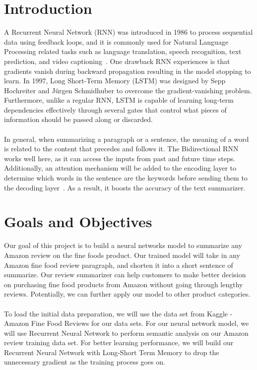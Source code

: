 \documentclass[conference]{IEEEtran}
\begin{document}
\section{Introduction}
A Recurrent Neural Network (RNN) was introduced in 1986 to process sequential data using feedback loops, and it is commonly used for Natural Language Processing related tasks such as language translation, speech recognition, text prediction, and video captioning~\cite{staudemeyer2019understanding}. One drawback RNN experiences is that gradients vanish during backward propagation resulting in the model stopping to learn. In 1997, Long Short-Term Memory (LSTM) was designed by Sepp Hochreiter and J\"{u}rgen Schmidhuber to overcome the gradient-vanishing problem. Furthermore, unlike a regular RNN, LSTM is capable of learning long-term dependencies effectively through several gates that control what pieces of information should be passed along or discarded. \\ \\
\indent In general, when summarizing a paragraph or a sentence, the meaning of a word is related to the content that precedes and follows it. The Bidirectional RNN works well here, as it can access the inputs from past and future time steps. Additionally, an attention mechanism will be added to the encoding layer to determine which words in the sentence are the keywords before sending them to the decoding layer~\cite{vaswani2017attention}. As a result, it boosts the accuracy of the text summarizer.

\section{Goals and Objectives}
Our goal of this project is to build a neural networks model to summarize any Amazon review on the fine foods product. Our trained model will take in any Amazon fine food review paragraph, and shorten it into a short sentence of summarize. Our review summarizer can help customers to make better decision on purchasing fine food products from Amazon without going through lengthy reviews. Potentially, we can further apply our model to other product categories.\\\\
\indent To load the initial data preparation, we will use the data set from Kaggle - Amazon Fine Food Reviews for our data sets. For our neural network model, we will use Recurrent Neural Network to perform semantic analysis on our Amazon review training data set. For better learning performance, we will build our Recurrent Neural Network with Long-Short Term Memory to drop the unnecessary gradient as the training process goes on.
\end{document}

